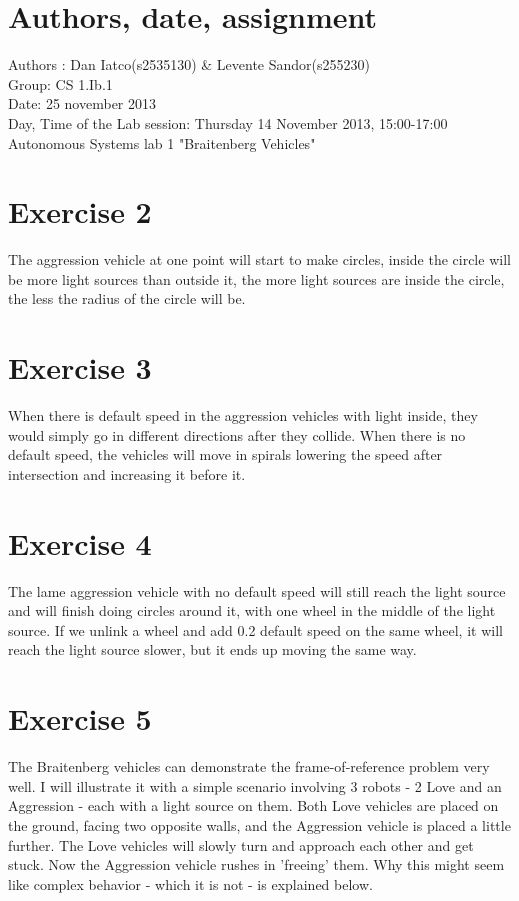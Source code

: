 \documentclass[a4paper,10pt]{article}
\begin{document}
\section*{Authors, date, assignment}
Authors : Dan Iatco(s2535130) \& Levente Sandor(s255230)\\
Group: CS 1.Ib.1 \\
Date:  25 november 2013\\
Day, Time of the Lab session: Thursday 14 November 2013, 15:00-17:00 \\
Autonomous Systems lab 1 "Braitenberg Vehicles"\\

\section*{Exercise 2}
  The aggression vehicle at one point will start to make circles, inside the circle will be more light sources than outside it, the more light sources are inside the circle, the less the radius of the circle will be.
\section*{Exercise 3}
  When there is default speed in the aggression vehicles with light inside, they would simply go in different directions after they collide. When there is no default speed, the vehicles will move in spirals lowering the speed after intersection and increasing it before it.
\section*{Exercise 4}
  The lame aggression vehicle with no default speed will still reach the light source and will finish doing circles around it, with one wheel in the middle of the light source. If we unlink a wheel and add 0.2 default speed on the same wheel, it will reach the light source slower, but it ends up moving the same way.
\section*{Exercise 5}
  \par
    The Braitenberg vehicles can demonstrate the frame-of-reference problem very well. I will
    illustrate it with a simple scenario involving 3 robots - 2 Love and an Aggression - each with a light
    source on them. Both Love vehicles are placed on the ground, facing two opposite walls, and the Aggression
    vehicle is placed a little further. The Love vehicles will slowly turn and approach each other and get
    stuck. Now the Aggression vehicle rushes in 'freeing' them. Why this might seem like complex behavior
    - which it is not - is explained below.
\end{document}
